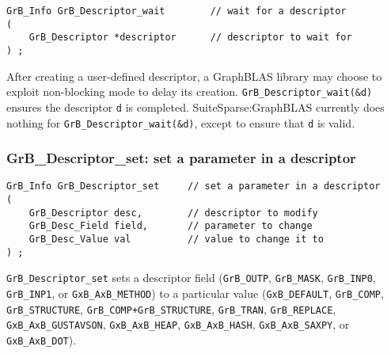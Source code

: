 \documentclass[12pt]{article}
\begin{document}
\begin{mdframed}[userdefinedwidth=6in]
{\footnotesize
\begin{verbatim}
GrB_Info GrB_Descriptor_wait        // wait for a descriptor
(
    GrB_Descriptor *descriptor      // descriptor to wait for
) ;
\end{verbatim}
}\end{mdframed}

After creating a user-defined descriptor, a GraphBLAS library may choose to
exploit non-blocking mode to delay its creation.
\verb'GrB_Descriptor_wait(&d)' ensures the descriptor \verb'd' is completed.
SuiteSparse:GraphBLAS currently does nothing for
\verb'GrB_Descriptor_wait(&d)', except to ensure that \verb'd' is valid.

\subsubsection{{\sf GrB\_Descriptor\_set:}  set a parameter in a descriptor}
\label{descriptor_set}

\begin{mdframed}[userdefinedwidth=6in]
{\footnotesize
\begin{verbatim}
GrB_Info GrB_Descriptor_set     // set a parameter in a descriptor
(
    GrB_Descriptor desc,        // descriptor to modify
    GrB_Desc_Field field,       // parameter to change
    GrB_Desc_Value val          // value to change it to
) ;
\end{verbatim} } \end{mdframed}

\verb'GrB_Descriptor_set' sets a descriptor field (\verb'GrB_OUTP',
\verb'GrB_MASK', \verb'GrB_INP0', \verb'GrB_INP1', or \verb'GxB_AxB_METHOD') to
a particular value (\verb'GxB_DEFAULT', \verb'GrB_COMP',
\verb'GrB_STRUCTURE', \verb'GrB_COMP+GrB_STRUCTURE', \verb'GrB_TRAN',
\verb'GrB_REPLACE', \verb'GxB_AxB_GUSTAVSON', \verb'GxB_AxB_HEAP',
\verb'GxB_AxB_HASH',
\verb'GxB_AxB_SAXPY',
or
\verb'GxB_AxB_DOT').
\end{document}
